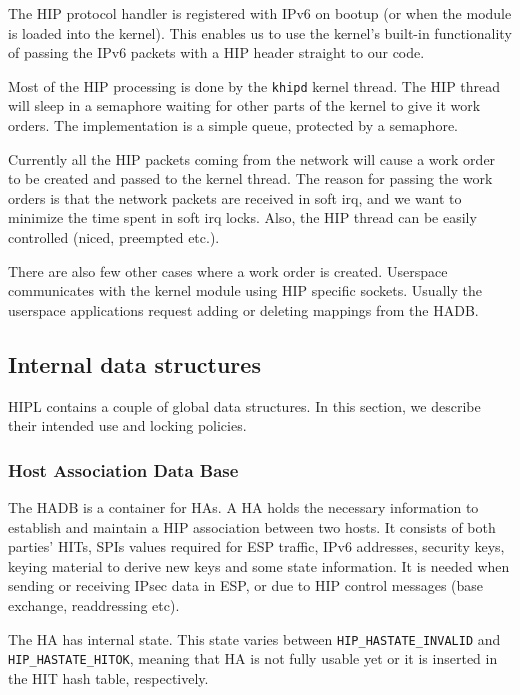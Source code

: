 The HIP protocol handler is registered with IPv6 on bootup (or when
the module is loaded into the kernel). This enables us to use the
kernel's built-in functionality of passing the IPv6 packets with a HIP
header straight to our code.

Most of the \ac{HIP} processing is done by the \verb|khipd| kernel
thread. The \ac{HIP} thread will sleep in a semaphore waiting for
other parts of the kernel to give it work orders. The implementation
is a simple queue, protected by a semaphore.

Currently all the \ac{HIP} packets coming from the network will cause
a work order to be created and passed to the kernel thread. The reason
for passing the work orders is that the network packets are received
in soft irq, and we want to minimize the time spent in soft irq locks.
Also, the \ac{HIP} thread can be easily controlled (niced, preempted
etc.).

There are also few other cases where a work order is
created. Userspace communicates with the kernel module using \ac{HIP}
specific sockets. Usually the userspace applications request adding or
deleting mappings from the \ac{HADB}.

\subsection{Internal data structures}

\ac{HIPL} contains a couple of global data structures. In this
section, we describe their intended use and locking policies.

\subsubsection{Host Association Data Base}
\label{sec:hadb}

The \ac{HADB} is a container for \acp{HA}. A \ac{HA} holds the
necessary information to establish and maintain a \ac{HIP} association
between two hosts. It consists of both parties' \acp{HIT}, \acp{SPI}
values required for \ac{ESP} traffic, IPv6 addresses, security keys,
keying material to derive new keys and some state information. It is
needed when sending or receiving \ac{IPsec} data in \ac{ESP}, or due
to \ac{HIP} control messages (base exchange, readdressing etc).

The \ac{HA} has internal state. This state varies between
\verb|HIP_HASTATE_INVALID| and \verb|HIP_HASTATE_HITOK|, meaning that
\ac{HA} is not fully usable yet or it is inserted in the HIT hash
table, respectively.

